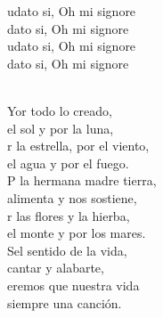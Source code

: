 \documentclass[12pt]{article}
\begin{document}
\begin{multicols*}{2}
\begin{cancion}[Laudato][]%
	\begin{chorus}%
	udato si, Oh mi signore\\
	dato si, Oh mi signore\\
	udato si, Oh mi signore\\
	dato si, Oh mi signore\\
	\end{chorus}%
	\jump\\
	Yor todo lo creado,\\
	 el sol y por la luna,\\
	r la estrella, por el viento,\\
	 el agua y por el fuego.\\
\jump
	P la hermana madre tierra,\\
	 alimenta y nos sostiene,\\
	r las flores y la hierba,\\
	 el monte y por los mares.\\
\jump
	Sel sentido de la vida,\\
	cantar y alabarte,\\
	eremos que nuestra vida\\
	 siempre una canción.\\
\end{cancion}%


\end{multicols*}
\end{document}
